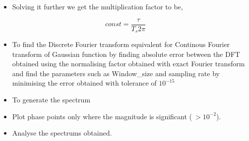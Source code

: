 \documentclass[11pt, a4paper]{article}
\begin{document}
\begin{itemize}

\item
  Solving it further we get the multiplication factor to be,
\end{itemize}

\begin{equation}
const = \frac{\tau}{T_s 2\pi}
\end{equation}

\begin{itemize}

\item
  To find the Discrete Fourier transform equivalent for Continous
  Fourier transform of Gaussian function by finding absolute error
  between the DFT obtained using the normalising factor obtained with
  exact Fourier transform and find the parameters such as Window\_size
  and sampling rate by minimising the error obtained with tolerance of
  \(10^{-15}\)
\item
  To generate the spectrum
\item
  Plot phase points only where the magnitude is significant
  (\(\ > 10^{-2}\)).
\item
  Analyse the spectrums obtained.
\end{itemize}
\end{document}
